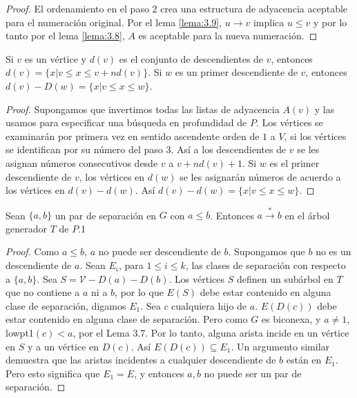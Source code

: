 \begin{proof}
El ordenamiento en el paso 2 crea una estructura de adyacencia aceptable para el numeración original. Por el lema \ref{lema:3.9}, $u \rightarrow v$ implica $u \le v$ y por lo tanto por el lema \ref{lema:3.8}, $A$ es aceptable para la nueva numeración.
\end{proof}

\begin{lemma}
Si $v$ es un vértice y $d\left(v\right)$ es el conjunto de descendientes de $v$, entonces $d\left(v\right) = \{x | v \leq x \le v + nd\left(v\right)\}$. Si $w$ es un primer descendiente de $v$, entonces $d\left(v\right)-D\left(w\right) = \{x | v \leq x \le w\}$.
\label{lemma:3.11}
\end{lemma}

\begin{proof}
Supongamos que invertimos todas las listas de adyacencia $A\left(v\right)$ y las usamos para especificar una búsqueda en profundidad de $P$. Los vértices se examinarán por primera vez en sentido ascendente orden de $1$ a $V$, si los vértices se identifican por su número del paso 3. Así a los descendientes de $v$ se les asignan números consecutivos desde $v$ a $v + nd\left(v\right) + 1$. Si $w$ es el primer descendiente de $v$, los vértices en $d\left(w\right)$ se les asignarán números de acuerdo a los vértices en $d\left(v\right) - d\left(w\right)$. Así $d\left(v\right) - d\left(w\right) = \{x | v \leq x \le w\}$.
\end{proof}

\begin{lemma}
Sean $\{a, b\}$ un par de separación en $G$ con $a \le b$. Entonces $a \overset{\ast}{\rightarrow} b$ en el árbol generador $T$ de $P$.1
\label{lema:3.12}
\end{lemma}

\begin{proof}
Como $a \le b$, $a$ no puede ser descendiente de $b$. Supongamos que $b$ no es un descendiente de $a$. Sean $E_{i}$, para $1 \leq i \le k$, las clases de separación con respecto a $\{a, b\}$. Sea $S = \mathscr{V} - D\left(a\right) - D\left(b\right)$. Los vértices $S$ definen un subárbol en $T$ que no contiene a $a$ ni a $b$, por lo que $E\left(S\right)$ debe estar contenido en alguna clase de separación, digamos $E_{1}$. Sea $c$ cualquiera hijo de $a$. $E\left(D\left(c\right)\right)$ debe estar contenido en alguna clase de separación. Pero como $G$ es biconexa, y $a \neq 1$, lowpt1$\left(c\right) < a$, por el Lema 3.7. Por lo tanto, alguna arista incide en un vértice en $S$ y a un vértice en $D\left(c\right)$. Así $E\left(D\left(c\right)\right) \subseteq E_{1}$. Un argumento similar demuestra que las aristas incidentes a cualquier descendiente de $b$ están en $E_{1}$. Pero esto significa que $E_{1} = E$, y entonces ${a, b}$ no puede ser un par de separación.
\end{proof}

